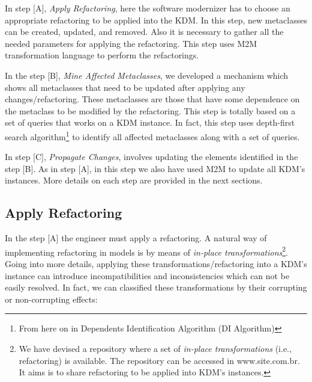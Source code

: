 In step [A], \textit{Apply Refactoring}, here the software modernizer has to choose an appropriate refactoring to be applied into the KDM. In this step, new metaclasses can be created, updated, and removed. Also it is necessary to gather all the needed parameters for applying the refactoring. %
This step uses M2M transformation language to perform the refactorings.

In the step [B], \textit{Mine Affected Metaclasses}, we developed a mechanism which shows all metaclasses that need to be updated after applying any changes/refactoring. These metaclasses are those that have some dependence on the metaclass to be modified by the refactoring. This step is totally based on a set of queries that works on a KDM instance. In fact, this step uses depth-first search algorithm\footnote{From here on in Dependents Identification Algorithm (DI Algorithm)} to identify all affected metaclasses along with a set of queries. 

In step [C], \textit{Propagate Changes}, involves updating the elements identified in the step [B].  As in step [A], in this step we also have used M2M to update all KDM's instances. 
More details on each step are provided in the next sections.


\subsection{Apply Refactoring} %
\label{sub:apply_refactoring}

In the step [A] the engineer must apply a refactoring. A natural way of implementing refactoring in models is by means of \textit{in-place transformations}\footnote{We have devised a repository where a set of \textit{in-place transformations} (i.e., refactoring) is available. The repository can be accessed in www.site.com.br. It aims is to share refactoring to be applied into KDM's instances.}. %
Going into more details, applying these transformations/refactoring into a KDM's instance can introduce incompatibilities and inconsistencies which can not be easily resolved. In fact, we can classified these transformations by their corrupting or non-corrupting effects:%

